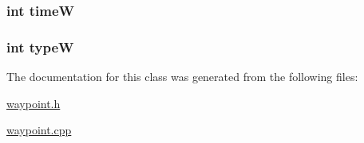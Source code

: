 \hypertarget{a00016_a9b8846f46bee60510747bd5c64dc4c8c}{
\subsubsection[{time\-W}]{\setlength{\rightskip}{0pt plus 5cm}int time\-W}}\label{a00016_a9b8846f46bee60510747bd5c64dc4c8c}
\hypertarget{a00016_a68b799c80d746b250ae6aa7ff5df52db}{
\subsubsection[{type\-W}]{\setlength{\rightskip}{0pt plus 5cm}int type\-W}}\label{a00016_a68b799c80d746b250ae6aa7ff5df52db}


The documentation for this class was generated from the following files\-:\begin{DoxyCompactItemize}
\item 
\hyperlink{a00045}{waypoint.\-h}\item 
\hyperlink{a00044}{waypoint.\-cpp}\end{DoxyCompactItemize}

